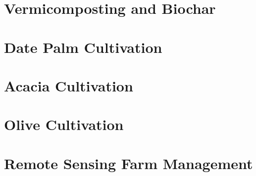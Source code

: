 \documentclass[12pt,a4paper,twoside]{report}
\begin{document}
\chapter{Vermicomposting and Biochar}









\chapter{Date Palm Cultivation}









\chapter{Acacia Cultivation}









\chapter{Olive Cultivation}









\chapter{Remote Sensing Farm Management}








\end{document}
